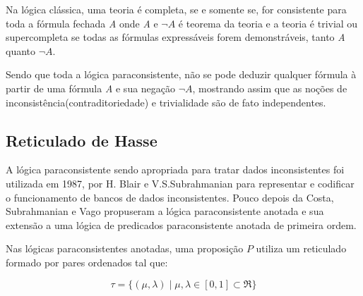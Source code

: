 Na lógica clássica, uma teoria é completa, se e somente se, for consistente para toda a fórmula fechada \emph{A} onde \emph{A} e \emph{$\neg A$} é teorema da teoria e a teoria é trivial ou supercompleta se todas as fórmulas expressáveis forem demonstráveis, tanto \emph{A} quanto \emph{$ \neg A$}.


Sendo que toda a lógica paraconsistente, não se pode deduzir qualquer fórmula à partir de uma fórmula \emph{A} e sua negação \emph{$\neg A$}, mostrando assim que as noções de inconsistência(contraditoriedade) e trivialidade são de fato independentes.







\subsection{Reticulado de Hasse}

A lógica paraconsistente sendo apropriada para tratar dados inconsistentes foi utilizada em 1987, por H. Blair e V.S.Subrahmanian para representar e codificar o funcionamento de bancos de dados inconsistentes. Pouco depois da Costa, Subrahmanian e Vago propuseram a lógica paraconsistente anotada e sua extensão a uma lógica de predicados paraconsistente anotada de primeira ordem. 

Nas lógicas paraconsistentes anotadas, uma proposição $P$ utiliza um reticulado formado por pares ordenados tal que: 

\begin{center}
\begin{equation}
\tau = \{ ( \mu , \lambda ) \mid \mu ,\lambda \in [0,1] \subset \Re \}
\end{equation}
\end{center}

